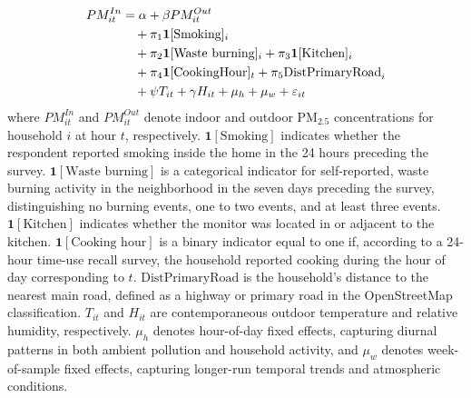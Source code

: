 \documentclass[9pt,twocolumn,twoside]{pnas-new}
\begin{document}
\begin{align}
\label{eq:infiltration}
    PM^{In}_{it} &= \alpha + \beta PM^{Out}_{it}  \\
    &\quad + \pi_1 \mathbf{1}[\text{Smoking}]_i  \notag \\ &\quad+ \pi_2 \mathbf{1}[\text{Waste burning}]_i + \pi_3 \mathbf{1}[\text{Kitchen}]_i \notag \\ &\quad + \pi_4 \mathbf{1}[\text{CookingHour}]_t + \pi_5 \text{DistPrimaryRoad}_i \notag \\ &\quad+ \psi T_{it} + \gamma H_{it} + \mu_h + \mu_w + \varepsilon_{it} \notag
\end{align}
where $PM^{In}_{it}$ and $PM^{Out}_{it}$ denote indoor and outdoor PM$_{2.5}$ 
concentrations for household $i$ at hour $t$, respectively. 
$\mathbf{1}[\text{Smoking}]$ indicates whether the respondent reported smoking 
inside the home in the 24 hours preceding the survey. 
$\mathbf{1}[\text{Waste burning}]$ is a categorical indicator for self-reported, waste burning activity in the neighborhood in the seven days preceding the survey, 
distinguishing no burning events, one to two events, and at least three events. 
$\mathbf{1}[\text{Kitchen}]$ indicates whether the monitor was located in or  adjacent to the kitchen. 
$\mathbf{1}[\text{Cooking hour}]$ is a binary indicator equal to one if, according to a 24-hour time-use recall survey, the household reported cooking during the hour of day corresponding to $t$. 
$\text{DistPrimaryRoad}$ is the household's distance to the nearest main road, defined as a highway or primary road in the OpenStreetMap classification. 
$T_{it}$ and $H_{it}$ are contemporaneous outdoor temperature and relative 
humidity, respectively. 
$\mu_h$ denotes hour-of-day fixed effects, capturing diurnal patterns in both 
ambient pollution and household activity, and $\mu_w$ denotes week-of-sample  fixed effects, capturing longer-run temporal trends and atmospheric conditions.
\end{document}
